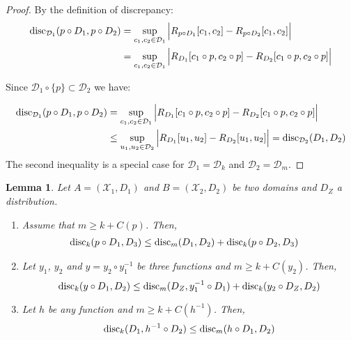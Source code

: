 \documentclass{article} %
\newtheorem{lem}{Lemma}
\newcommand{\disc}{\textnormal{disc}}
\begin{document}
\begin{proof} By the definition of discrepancy:
\begin{equation}
\begin{aligned}
\disc_{\mathcal{D}_1}(p \circ D_1, p\circ D_2) 
&= \sup_{c_1,c_2 \in \mathcal{D}_1} 
\Big\vert R_{p \circ D_1}[c_1,c_2] - R_{p \circ D_2}[c_1,c_2]\Big\vert \\
&= \sup_{c_1,c_2 \in \mathcal{D}_1} 
\Big\vert R_{D_1}[c_1\circ p,c_2\circ p] - R_{D_2}[c_1\circ p,c_2\circ p]\Big\vert \\
\end{aligned}
\end{equation}

Since $\mathcal{D}_1 \circ \{ p \} \subset \mathcal{D}_2$ we have:

\begin{equation}
\begin{aligned}
\disc_{\mathcal{D}_1}(p \circ D_1, p\circ D_2) 
&= \sup_{c_1,c_2 \in \mathcal{D}_1} 
\Big\vert R_{D_1}[c_1\circ p,c_2\circ p] - R_{D_2}[c_1\circ p,c_2\circ p]\Big\vert \\
&\leq \sup_{u_1,u_2 \in \mathcal{D}_2} 
\Big\vert R_{D_1}[u_1,u_2] - R_{D_2}[u_1,u_2]\Big\vert = \disc_{\mathcal{D}_2}(D_1, D_2) 
\end{aligned}
\end{equation} 
The second inequality is a special case for $\mathcal{D}_1 = \mathcal{D}_k$ and $\mathcal{D}_2 = \mathcal{D}_m$. 
\end{proof}

\begin{lem}\label{lem:easy} Let $A = (\mathcal{X}_1,D_1)$ and $B = (\mathcal{X}_2,D_2)$
be two domains and $D_Z$ a distribution. 
\begin{enumerate}
\item Assume that $m \geq k + C(p)$. Then, 
\begin{equation}
\begin{aligned}
\disc_{k}(p \circ D_1, D_3) &\leq \disc_{m}(D_1, D_2) + 
\disc_{k}(p \circ D_2, D_3)
\end{aligned}
\end{equation}
\item Let $y_1$, $y_2$ and $y = y_2 \circ y^{-1}_1$ be three functions and $m \geq k + C(y_2)$. Then,
\begin{equation}
\disc_{k}(y\circ D_1, D_2) \leq \disc_{m}(D_Z,y^{-1}_1 \circ D_1) + \disc_{k}(y_2 \circ D_Z,D_2)
\end{equation}
\item Let $h$ be any function and $m \geq k+C(h^{-1})$. Then,
\begin{equation}
\disc_{k}(D_1, h^{-1} \circ D_2) \leq \disc_{m}(h \circ D_1, D_2)
\end{equation}
\end{enumerate}   
\end{lem}
\end{document}
